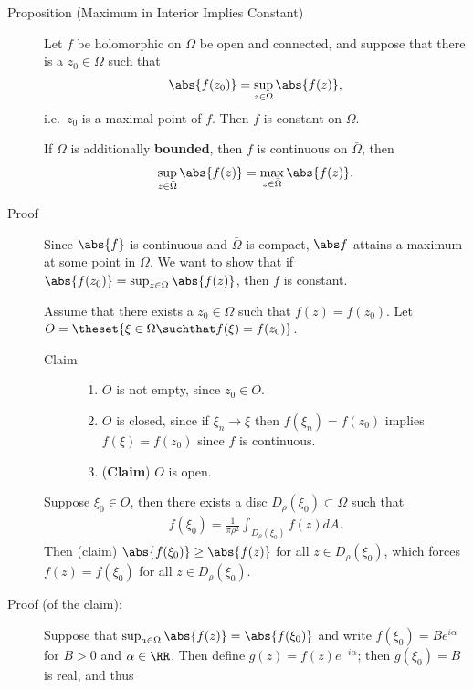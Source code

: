\begin{description}
\item[Proposition (Maximum in Interior Implies Constant)]
Let \(f\) be holomorphic on \(\Omega\) be open and connected, and
suppose that there is a \(z_0 \in \Omega\) such that
\begin{align*}\abs{f(z_0)} = \sup_{z\in \Omega} \abs{f(z)},\end{align*}
i.e.~\(z_0\) is a maximal point of \(f\). Then \(f\) is constant on
\(\Omega\).

If \(\Omega\) is additionally \textbf{bounded}, then \(f\) is continuous
on \(\bar \Omega\), then
\begin{align*}\sup_{z \in \bar\Omega} \abs{f(z)} = \max_{z\in\bar\Omega} \abs{f(z)}.\end{align*}
\item[Proof]
Since \(\abs{f}\) is continuous and \(\bar \Omega\) is compact,
\(\abs f\) attains a maximum at some point in \(\bar \Omega\). We want
to show that if \(\abs{f(z_0)} = \sup_{z\in \Omega} \abs{f(z)}\), then
\(f\) is constant.

Assume that there exists a \(z_0 \in \Omega\) such that
\(f(z) = f(z_0)\). Let
\(O = \theset{ \xi\in \Omega \suchthat f(\xi) = f(z_0) }\).

\begin{description}
\item[Claim]
\begin{enumerate}
\def\labelenumi{\arabic{enumi}.}
\tightlist
\item
  \(O\) is not empty, since \(z_0 \in O\).
\item
  \(O\) is closed, since if \(\xi_n \to \xi\) then \(f(\xi_n) = f(z_0)\)
  implies \(f(\xi) = f(z_0)\) since \(f\) is continuous.
\item
  (\textbf{Claim}) \(O\) is open.
\end{enumerate}
\end{description}

Suppose \(\xi_0 \in O\), then there exists a disc
\(D_\rho(\xi_0) \subset \Omega\) such that
\begin{align*}f(\xi_0) = \frac{1}{\pi\rho^2} \int_{D_\rho(\xi_0)} f(z) dA.\end{align*}
Then (claim) \(\abs{f(\xi_0)} \geq \abs{f(z)}\) for all
\(z\in D_\rho(\xi_0)\), which forces \(f(z) = f(\xi_0)\) for all
\(z\in D_\rho(\xi_0)\).
\item[Proof (of the claim):]
Suppose that \(\sup_{a\in \Omega} \abs{f(z)} = \abs{f(\xi_0)}\) and
write \(f(\xi_0) = Be^{i\alpha}\) for \(B>0\) and \(\alpha \in \RR\).
Then define \(g(z) = f(z) e^{-i\alpha}\); then \(g(\xi_0) = B\) is real,
and thus


\end{description}

